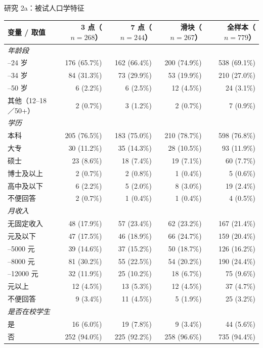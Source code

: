 \documentclass[aspectratio=169,professionalfonts]{beamer}
\begin{document}
\begin{frame}{研究 2a：被试人口学特征}
  \tiny
  \setlength{\tabcolsep}{3pt}
  \renewcommand{\arraystretch}{0.92}
  \begin{table}
    \centering
    \begin{tabular}{lrrrr}
      \toprule
      变量 / 取值 & 3 点（$n{=}268$） & 7 点（$n{=}244$） & 滑块（$n{=}267$） & 全样本（$n{=}779$） \\
      \midrule
      \multicolumn{5}{l}{\textit{年龄段}} \\
      \quad 18--24 岁 & 176 (65.7\%) & 162 (66.4\%) & 200 (74.9\%) & 538 (69.1\%) \\
      \quad 24--34 岁 & 84 (31.3\%)  & 73 (29.9\%)  & 53 (19.9\%)  & 210 (27.0\%) \\
      \quad 35--50 岁 & 6 (2.2\%)    & 6 (2.5\%)    & 12 (4.5\%)   & 24 (3.1\%)   \\
      \quad 其他（12--18／50+） & 2 (0.7\%) & 3 (1.2\%) & 2 (0.7\%) & 7 (0.9\%) \\
      \midrule
      \multicolumn{5}{l}{\textit{学历}} \\
      \quad 本科 & 205 (76.5\%) & 183 (75.0\%) & 210 (78.7\%) & 598 (76.8\%) \\
      \quad 大专 & 30 (11.2\%)  & 35 (14.3\%)  & 28 (10.5\%)  & 93 (11.9\%)  \\
      \quad 硕士 & 23 (8.6\%)   & 18 (7.4\%)   & 19 (7.1\%)   & 60 (7.7\%)   \\
      \quad 博士及以上 & 2 (0.7\%) & 2 (0.8\%) & 1 (0.4\%) & 5 (0.6\%) \\
      \quad 高中及以下 & 6 (2.2\%) & 5 (2.0\%) & 8 (3.0\%) & 19 (2.4\%) \\
      \quad 不便回答 & 2 (0.7\%) & 1 (0.4\%) & 1 (0.4\%) & 4 (0.5\%) \\
      \midrule
      \multicolumn{5}{l}{\textit{月收入}} \\
      \quad 无固定收入 & 48 (17.9\%) & 57 (23.4\%) & 62 (23.2\%) & 167 (21.4\%) \\
      \quad 3000 元及以下 & 47 (17.5\%) & 46 (18.9\%) & 66 (24.7\%) & 159 (20.4\%) \\
      \quad 3001--5000 元 & 39 (14.6\%) & 37 (15.2\%) & 50 (18.7\%) & 126 (16.2\%) \\
      \quad 5001--8000 元 & 81 (30.2\%) & 55 (22.5\%) & 54 (20.2\%) & 190 (24.4\%) \\
      \quad 8001--12000 元 & 32 (11.9\%) & 25 (10.2\%) & 18 (6.7\%) & 75 (9.6\%) \\
      \quad 12000 元以上 & 12 (4.5\%)  & 13 (5.3\%) & 12 (4.5\%) & 37 (4.7\%) \\
      \quad 不便回答 & 9 (3.4\%) & 11 (4.5\%) & 5 (1.9\%) & 25 (3.2\%) \\
      \midrule
      \multicolumn{5}{l}{\textit{是否在校学生}} \\
      \quad 是 & 16 (6.0\%)   & 19 (7.8\%)   & 9 (3.4\%)    & 44 (5.6\%)   \\
      \quad 否 & 252 (94.0\%) & 225 (92.2\%) & 258 (96.6\%) & 735 (94.4\%) \\
      \bottomrule
    \end{tabular}
  \end{table}


\end{frame}
\end{document}
